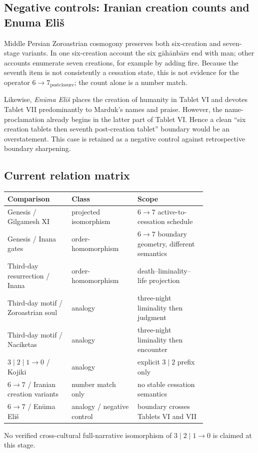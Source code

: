 \subsection{Negative controls: Iranian creation counts and Enuma Eli\v{s}}

Middle Persian Zoroastrian cosmogony preserves both six-creation and
seven-stage variants.  In one six-creation account the six g\={a}h\={a}nb\={a}rs
end with man; other accounts enumerate seven creations, for example by adding
fire.  Because the seventh item is not consistently a cessation state, this is
not evidence for the operator $6\to7_{\mathrm{postclosure}}$; the count alone
is a number match.

Likewise, \emph{En\=uma Eli\v{s}} places the creation of humanity in Tablet VI
and devotes Tablet VII predominantly to Marduk's names and praise.  However,
the name-proclamation already begins in the latter part of Tablet VI.  Hence a
clean ``six creation tablets then seventh post-creation tablet'' boundary would
be an overstatement.  This case is retained as a negative control against
retrospective boundary sharpening.

\subsection{Current relation matrix}

\begin{center}
\begin{tabular}{p{0.26\linewidth}p{0.25\linewidth}p{0.28\linewidth}}
\textbf{Comparison} & \textbf{Class} & \textbf{Scope}\\\hline
Genesis / Gilgamesh XI & projected isomorphism & $6\to7$ active-to-cessation schedule\\
Genesis / Inana gates & order-homomorphism & $6\to7$ boundary geometry, different semantics\\
Third-day resurrection / Inana & order-homomorphism & death--liminality--life projection\\
Third-day motif / Zoroastrian soul & analogy & three-night liminality then judgment\\
Third-day motif / Naciketas & analogy & three-night liminality then encounter\\
$3\mid2\mid1\to0$ / Kojiki & analogy & explicit $3\mid2$ prefix only\\
$6\to7$ / Iranian creation variants & number match only & no stable cessation semantics\\
$6\to7$ / En\=uma Eli\v{s} & analogy / negative control & boundary crosses Tablets VI and VII\\
\end{tabular}
\end{center}

No verified cross-cultural full-narrative isomorphism of
$3\mid2\mid1\to0$ is claimed at this stage.
